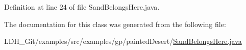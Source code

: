 Definition at line 24 of file Sand\-Belongs\-Here.\-java.



The documentation for this class was generated from the following file\-:\begin{DoxyCompactItemize}
\item 
L\-D\-H\-\_\-\-Git/examples/src/examples/gp/painted\-Desert/\hyperlink{_sand_belongs_here_8java}{Sand\-Belongs\-Here.\-java}\end{DoxyCompactItemize}

